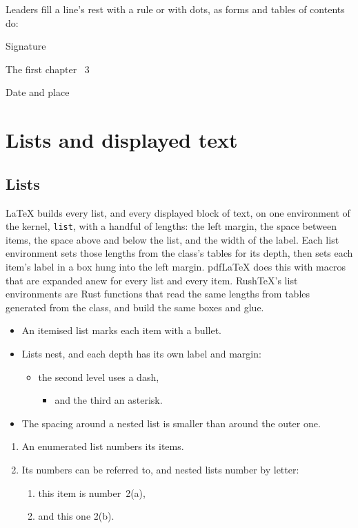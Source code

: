 \documentclass{article}
\numberwithin{equation}{section}
\theoremstyle{definition}
\theoremstyle{remark}
\begin{document}
Leaders fill a line's rest with a rule or with dots, as forms and tables of contents do:

\noindent Signature \hrulefill\par
\noindent The first chapter \dotfill\ 3\par
\noindent Date \hrulefill{} and place \dotfill

\section{Lists and displayed text}\label{sec:lists}

\subsection{Lists}

\LaTeX{} builds every list, and every displayed block of text, on one environment of the
kernel, \texttt{list}, with a handful of lengths: the left margin, the space between
items, the space above and below the list, and the width of the label. Each list
environment sets those lengths from the class's tables for its depth, then sets each
item's label in a box hung into the left margin. pdfLaTeX does this with macros that
are expanded anew for every list and every item. RushTeX's list environments are Rust
functions that read the same lengths from tables generated from the class, and build
the same boxes and glue.

\begin{itemize}
  \item\label{item:first-list} An itemised list marks each item with a bullet.
  \item Lists nest, and each depth has its own label and margin:
    \begin{itemize}
      \item the second level uses a dash,
        \begin{itemize}
          \item and the third an asterisk.
        \end{itemize}
    \end{itemize}
  \item The spacing around a nested list is smaller than around the outer one.
\end{itemize}

\begin{enumerate}
  \item An enumerated list numbers its items.
  \item Its numbers can be referred to, and nested lists number by letter:
    \begin{enumerate}
      \item\label{item:nested} this item is number~2(a),
      \item and this one 2(b).
    \end{enumerate}
\end{enumerate}
\end{document}
